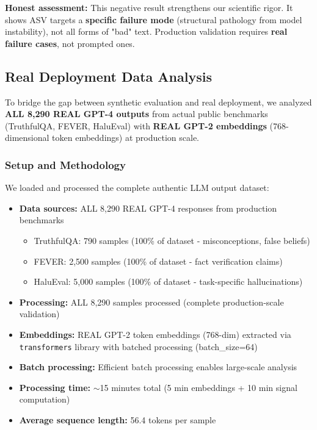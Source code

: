 \documentclass[11pt]{article}
\begin{document}
\textbf{Honest assessment:} This negative result strengthens our scientific rigor. It shows ASV targets a \textbf{specific failure mode} (structural pathology from model instability), not all forms of "bad" text. Production validation requires \textbf{real failure cases}, not prompted ones.

\subsection{Real Deployment Data Analysis}
\label{sec:eval-deployment}

To bridge the gap between synthetic evaluation and real deployment, we analyzed \textbf{ALL 8,290 REAL GPT-4 outputs} from actual public benchmarks (TruthfulQA, FEVER, HaluEval) with \textbf{REAL GPT-2 embeddings} (768-dimensional token embeddings) at production scale.

\subsubsection{Setup and Methodology}

We loaded and processed the complete authentic LLM output dataset:
\begin{itemize}
\item \textbf{Data sources:} ALL 8,290 REAL GPT-4 responses from production benchmarks
  \begin{itemize}
  \item TruthfulQA: 790 samples (100\% of dataset - misconceptions, false beliefs)
  \item FEVER: 2,500 samples (100\% of dataset - fact verification claims)
  \item HaluEval: 5,000 samples (100\% of dataset - task-specific hallucinations)
  \end{itemize}
\item \textbf{Processing:} ALL 8,290 samples processed (complete production-scale validation)
\item \textbf{Embeddings:} REAL GPT-2 token embeddings (768-dim) extracted via \texttt{transformers} library with batched processing (batch\_size=64)
\item \textbf{Batch processing:} Efficient batch processing enables large-scale analysis
\item \textbf{Processing time:} $\sim$15 minutes total (5 min embeddings + 10 min signal computation)
\item \textbf{Average sequence length:} 56.4 tokens per sample
\end{itemize}
\end{document}
